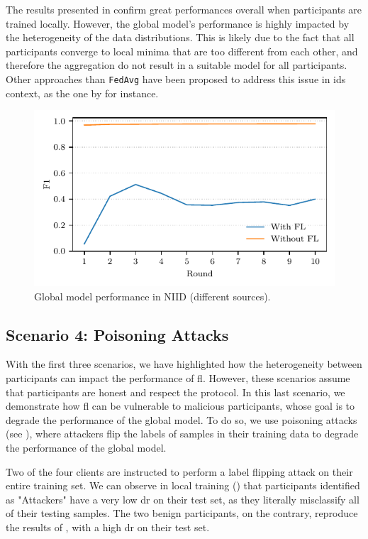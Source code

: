 The results presented in  confirm great performances overall when participants are trained locally. 
However, the global model's performance is highly impacted by the heterogeneity of the data distributions.
This is likely due to the fact that all participants converge to local minima that are too different from each other, and therefore the aggregation do not result in a suitable model for all participants.
Other approaches than \texttt{FedAvg} have been proposed to address this issue in \gls{ids} context, as the one by \textcite{popoola_FederatedDeepLearning_2021} for instance.

\begin{figure}
    \centering
    \includegraphics{figures/heterogeneous.pdf}
    \caption{Global model performance in NIID (different sources).}
    \label{fig:heterogeneous}
\end{figure}


\subsection{Scenario 4: Poisoning Attacks\label{sec:demo.poisoning}}

With the first three scenarios, we have highlighted how the heterogeneity between participants can impact the performance of \gls{fl}.
However, these scenarios assume that participants are honest and respect the protocol.
In this last scenario, we demonstrate how \gls{fl} can be vulnerable to malicious participants, whose goal is to degrade the performance of the global model.
To do so, we use poisoning attacks (see ), where attackers flip the labels of  samples in their training data to degrade the performance of the global model.

Two of the four clients are instructed to perform a label flipping attack on their entire training set.
We can observe in local training () that participants identified as "Attackers" have a very low \gls{dr} on their test set, as they literally misclassify all of their testing samples.
The two benign participants, on the contrary, reproduce the results of , with a high \gls{dr} on their test set.

